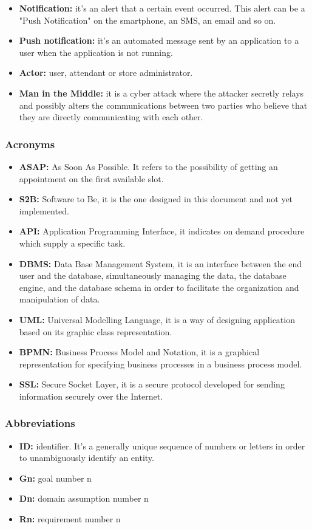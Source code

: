 \documentclass[table, 12pt]{article}
\begin{document}
\begin{flushleft}
\begin{itemize}
        \item \textbf{Notification:} it's an alert that a certain event occurred. This alert can be a "Push Notification" on the smartphone, an SMS, an email and so on.
        \item \textbf{Push notification:} it's an automated message sent by an application to a user when the application is not running.
        \item \textbf{Actor:} user, attendant or store administrator.
        \item \textbf{Man in the Middle:} it is a cyber attack where the attacker secretly relays and possibly alters the communications between two parties who believe that they are directly communicating with each other.
    \end{itemize}
    \subsubsection{Acronyms}
    \begin{itemize}
        \item {\textbf{ASAP:} As Soon As Possible. It refers to the possibility of getting an appointment on the first available slot.}
        \item {\textbf{S2B:} Software to Be, it is the one designed in this document and not yet implemented.}
        \item {\textbf{API:} Application Programming Interface, it indicates on demand procedure which supply a specific task.}
        \item \textbf{DBMS:} Data Base Management System, it is an interface between the end user and the database, simultaneously managing the data, the database engine, and the database schema in order to facilitate the organization and manipulation of data.
        \item {\textbf{UML:} Universal Modelling Language, it is a way of designing application based on its graphic class representation.}
        \item \textbf{BPMN:} Business Process Model and Notation, it is a graphical representation for specifying business processes in a business process model.
        \item \textbf{SSL:} Secure Socket Layer, it is a secure protocol developed for sending information securely over the Internet.
    \end{itemize}
    \subsubsection{Abbreviations}
    \begin{itemize}
        \item {\textbf{ID:} identifier. It's a generally unique sequence of numbers or letters in order to unambiguously identify an entity.}
        \item {\textbf{Gn:} goal number n}
        \item \textbf{Dn:} domain assumption number n
        \item \textbf{Rn:} requirement number n
    \end{itemize}

\end{flushleft}
\end{document}
